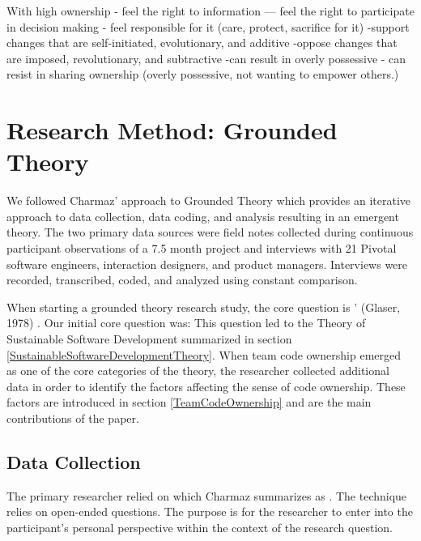 With high ownership
- feel the right to information
— feel the right to participate in decision making
- feel responsible for it (care, protect, sacrifice for it)
-support changes that are self-initiated, evolutionary, and additive \cite{Dirks1996}
-oppose changes that are imposed, revolutionary, and subtractive
-can result in overly possessive 
- can resist in sharing ownership (overly possessive, not wanting to empower others.)





\section{Research Method: Grounded Theory}
\label{ResearchMethod}

We followed Charmaz' approach to Grounded Theory \cite{Charmaz} which provides an iterative approach to data collection, data coding, and analysis resulting in an emergent theory. The two primary data sources were field notes collected during continuous participant observations of a 7.5 month project and interviews with 21 Pivotal software engineers, interaction designers, and product managers. Interviews were recorded, transcribed, coded, and analyzed using constant comparison. 

When starting a grounded theory research study, the core question is ' (Glaser, 1978) \cite{GlaserTheoreticalSensitivity}. Our initial core question was:  This question led to the Theory of Sustainable Software Development summarized in section \ref{SustainableSoftwareDevelopmentTheory}. When team code ownership emerged as one of the core categories of the theory, the researcher collected additional data in order to identify the factors affecting the sense of code ownership. These factors are introduced in section \ref{TeamCodeOwnership} and are the main contributions of the paper.
\subsection{Data Collection}
The primary researcher relied on  which Charmaz summarizes as  \cite{Charmaz}. The technique relies on open-ended questions. The purpose is for the researcher to enter into the participant's personal perspective within the context of the research question. 

